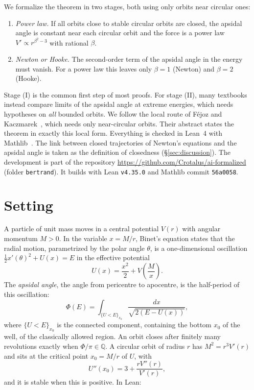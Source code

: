 \documentclass[11pt]{article}
\theoremstyle{remark}
\begin{document}
We formalize the theorem in two stages, both using only orbits near circular ones:
\begin{enumerate}
  \item[(I)] \emph{Power law.} If all orbits close to stable circular orbits are closed, the
  apsidal angle is constant near each circular orbit and the force is a power law
  $V'\propto r^{\beta^2-3}$ with rational $\beta$.
  \item[(II)] \emph{Newton or Hooke.} The second-order term of the apsidal angle in the energy
  must vanish. For a power law this leaves only $\beta=1$ (Newton) and $\beta=2$ (Hooke).
\end{enumerate}
Stage (I) is the common first step of most proofs. For stage (II), many textbooks instead compare
limits of the apsidal angle at extreme energies, which needs hypotheses on \emph{all} bounded
orbits. We follow the local route of Féjoz and Kaczmarek~\cite{fejoz2004}, which needs only
near-circular orbits. Their abstract states the theorem in exactly this local form. Everything is
checked in Lean~4 with Mathlib~\cite{mathlib2020}. The link between closed trajectories of
Newton's equations and the apsidal angle is taken as the definition of closedness
(\S\ref{sec:discussion}). The development is part of the repository
\url{https://github.com/Crotalus/ai-formalized} (folder \texttt{bertrand}). It builds with Lean
\texttt{v4.35.0} and Mathlib commit \texttt{56a0058}.

\section{Setting}

A particle of unit mass moves in a central potential $V(r)$ with angular momentum $M>0$. In the
variable $x=M/r$, Binet's equation states that the radial motion, parametrized by the polar angle
$\theta$, is a one-dimensional oscillation $\tfrac12 x'(\theta)^2+U(x)=E$ in the effective potential
\[
  U(x)=\frac{x^2}{2}+V\!\left(\frac{M}{x}\right).
\]
The \emph{apsidal angle}, the angle from pericentre to apocentre, is the half-period of this
oscillation:
\[
  \Phi(E)=\int_{\{U<E\}_{x_0}}\frac{dx}{\sqrt{2(E-U(x))}},
\]
where $\{U<E\}_{x_0}$ is the connected component, containing the bottom $x_0$ of the well, of the
classically allowed region. An orbit closes after finitely many revolutions exactly when
$\Phi/\pi\in\mathbb{Q}$. A circular orbit of radius $r$ has $M^2=r^3V'(r)$ and sits at the
critical point $x_0=M/r$ of $U$, with
\begin{equation}\label{eq:Upp}
  U''(x_0)=3+\frac{rV''(r)}{V'(r)} ,
\end{equation}
and it is stable when this is positive. In Lean:
\end{document}

